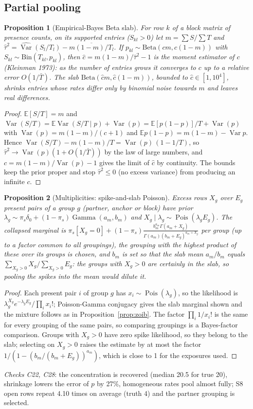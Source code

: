 \documentclass[11pt,a4paper]{article}
\newtheorem{proposition}{Proposition}
\theoremstyle{definition}
\theoremstyle{remark}
\newcommand{\E}{\mathbb{E}}
\newcommand{\Var}{\operatorname{Var}}
\newcommand{\Pois}{\operatorname{Pois}}
\newcommand{\Ga}{\operatorname{Gamma}}
\begin{document}
\subsection{Partial pooling}
\begin{proposition}[Empirical-Bayes Beta slab]\label{prop:ebbeta}
For row $k$ of a block matrix of presence counts, on its supported entries ($S_{kl}>0$) let $m=\sum S/\sum T$ and $\hat\tau^2=\widehat{\Var}(S_l/T_l)-\overline{m(1-m)/T_l}$. If $p_{kl}\sim\mathrm{Beta}(cm,c(1-m))$ with $S_{kl}\sim\mathrm{Bin}(T_{kl},p_{kl})$, then $\hat c=m(1-m)/\hat\tau^2-1$ is the moment estimator of $c$ (Kleinman 1973): as the number of entries grows it converges to $c$ up to a relative error $O(1/\bar T)$. The slab $\mathrm{Beta}(\hat cm,\hat c(1-m))$, bounded to $\hat c\in[1,10^4]$, shrinks entries whose rates differ only by binomial noise towards $m$ and leaves real differences.
\end{proposition}
\begin{proof}
$\E[S/T]=m$ and $\Var(S/T)=\E\Var(S/T\mid p)+\Var(p)=\E[p(1-p)]/T+\Var(p)$ with $\Var(p)=m(1-m)/(c+1)$ and $\E p(1-p)=m(1-m)-\Var p$. Hence $\Var(S/T)-m(1-m)/T=\Var(p)\,(1-1/T)$, so $\hat\tau^2\to\Var(p)(1+O(1/\bar T))$ by the law of large numbers, and $c=m(1-m)/\Var(p)-1$ gives the limit of $\hat c$ by continuity. The bounds keep the prior proper and stop $\hat\tau^2\le0$ (no excess variance) from producing an infinite $c$.
\end{proof}

\begin{proposition}[Multiplicities: spike-and-slab Poisson]\label{prop:mult}
Excess rows $X_g$ over $E_g$ present pairs of a group $g$ (partner, anchor or block) have prior $\lambda_g\sim\pi_s\delta_0+(1-\pi_s)\Ga(a_m,b_m)$ and $X_g\mid\lambda_g\sim\Pois(\lambda_gE_g)$. The collapsed marginal is $\pi_s[X_g=0]+(1-\pi_s)\frac{b_m^{a_m}\Gamma(a_m+X_g)}{\Gamma(a_m)(b_m+E_g)^{a_m+X_g}}$ per group (up to a factor common to all groupings), the grouping with the highest product of these over its groups is chosen, and $b_m$ is set so that the slab mean $a_m/b_m$ equals $\sum_{X_g>0}X_g/\sum_{X_g>0}E_g$: the groups with $X_g>0$ are certainly in the slab, so pooling the spikes into the mean would dilute it.
\end{proposition}
\begin{proof}
Each present pair $i$ of group $g$ has $x_i\sim\Pois(\lambda_g)$, so the likelihood is $\lambda_g^{X_g}e^{-\lambda_gE_g}/\prod_ix_i!$; Poisson-Gamma conjugacy gives the slab marginal shown and the mixture follows as in Proposition~\ref{prop:zoib}. The factor $\prod_i1/x_i!$ is the same for every grouping of the same pairs, so comparing groupings is a Bayes-factor comparison. Groups with $X_g>0$ have zero spike likelihood, so they belong to the slab; selecting on $X_g>0$ raises the estimate by at most the factor $1/(1-(b_m/(b_m+E_g))^{a_m})$, which is close to 1 for the exposures used.
\end{proof}
\noindent\emph{Checks C22, C28}: the concentration is recovered (median 20.5 for true 20), shrinkage lowers the error of $p$ by 27\%, homogeneous rates pool almost fully; S8 open rows repeat 4.10 times on average (truth 4) and the partner grouping is selected.
\end{document}
